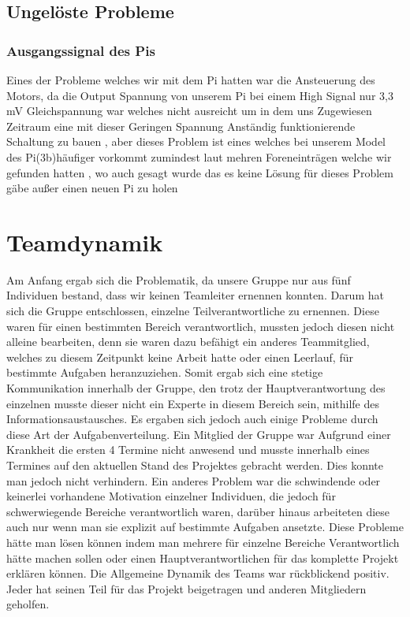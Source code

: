 \documentclass[notitlepage]{report}
\begin{document}
\subsection{Ungel\"{o}ste Probleme}

\subsubsection{Ausgangssignal des Pis}

Eines der Probleme welches wir mit dem Pi hatten war die Ansteuerung des Motors, da die Output Spannung von unserem Pi bei einem High Signal nur 3,3 mV Gleichspannung war welches nicht ausreicht um in dem uns Zugewiesen Zeitraum eine mit dieser Geringen Spannung Anständig funktionierende Schaltung zu bauen , aber dieses Problem ist eines welches bei unserem Model des Pi(3b)häufiger vorkommt zumindest laut mehren Foreneinträgen welche wir gefunden hatten , wo auch gesagt wurde das es keine Lösung für dieses Problem gäbe außer einen neuen Pi zu holen 


\section{Teamdynamik}

Am Anfang ergab sich die Problematik, da unsere Gruppe nur aus fünf Individuen bestand, dass wir keinen Teamleiter ernennen konnten. Darum hat sich die Gruppe entschlossen, einzelne Teilverantwortliche zu ernennen. Diese waren für einen bestimmten Bereich verantwortlich, mussten jedoch diesen nicht alleine bearbeiten, denn sie waren dazu befähigt ein anderes Teammitglied, welches zu diesem Zeitpunkt keine Arbeit hatte oder einen Leerlauf, für bestimmte Aufgaben heranzuziehen.
Somit ergab sich eine stetige Kommunikation innerhalb der Gruppe, den trotz der Hauptverantwortung des einzelnen musste dieser nicht ein Experte in diesem Bereich sein, mithilfe des Informationsaustausches.
Es ergaben sich jedoch auch einige Probleme durch diese Art der Aufgabenverteilung. Ein Mitglied der Gruppe war Aufgrund einer Krankheit die ersten 4 Termine nicht anwesend und musste innerhalb eines Termines auf den aktuellen Stand des Projektes gebracht werden. Dies konnte man jedoch nicht verhindern. Ein anderes Problem war die schwindende oder keinerlei vorhandene Motivation einzelner Individuen, die jedoch für schwerwiegende Bereiche verantwortlich waren, darüber hinaus arbeiteten diese auch nur wenn man sie explizit auf bestimmte Aufgaben ansetzte. 
Diese Probleme hätte man lösen können indem man mehrere für einzelne Bereiche Verantwortlich hätte machen sollen oder einen Hauptverantwortlichen für das komplette Projekt erklären können.
Die Allgemeine Dynamik des Teams war rückblickend positiv. Jeder hat seinen Teil für das Projekt beigetragen und anderen Mitgliedern geholfen.
\end{document}
